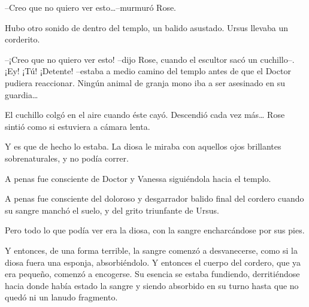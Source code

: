 --Creo que no quiero ver esto\ldots{}--murmuró Rose.

Hubo otro sonido de dentro del templo, un balido asustado. Ursus llevaba
un corderito.

--¡Creo que no quiero ver esto! --dijo Rose, cuando el escultor sacó un
cuchillo--. ¡Ey! ¡Tú! ¡Detente! --estaba a medio camino del templo antes
de que el Doctor pudiera reaccionar. Ningún animal de granja mono iba a
ser asesinado en su guardia\ldots{}

El cuchillo colgó en el aire cuando éste cayó. Descendió cada vez
más\ldots{} Rose sintió como si estuviera a cámara lenta.

Y es que de hecho lo estaba. La diosa le miraba con aquellos ojos
brillantes sobrenaturales, y no podía correr.

A penas fue consciente de Doctor y Vanessa siguiéndola hacia el templo.

A penas fue consciente del doloroso y desgarrador balido final del
cordero cuando su sangre manchó el suelo, y del grito triunfante de
Ursus.

Pero todo lo que podía ver era la diosa, con la sangre encharcándose por
sus pies.

Y entonces, de una forma terrible, la sangre comenzó a desvanecerse,
como si la diosa fuera una esponja, absorbiéndolo. Y entonces el cuerpo
del cordero, que ya era pequeño, comenzó a encogerse. Su esencia se
estaba fundiendo, derritiéndose hacia donde había estado la sangre y
siendo absorbido en su turno hasta que no quedó ni un lanudo fragmento.
